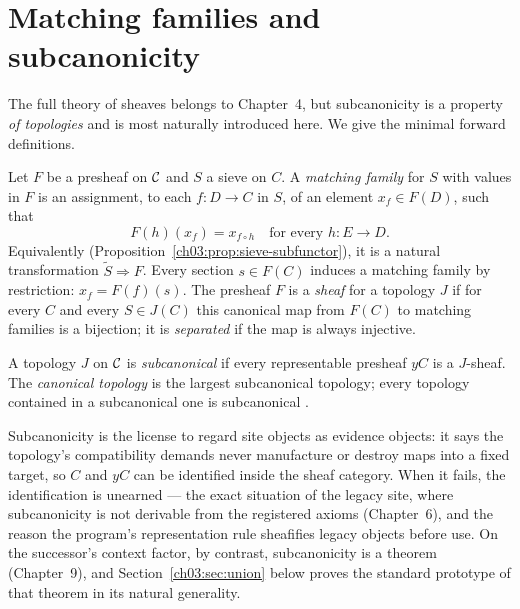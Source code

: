 \section{Matching families and subcanonicity}\label{ch03:sec:subcanonical}

The full theory of sheaves belongs to Chapter~4, but subcanonicity
is a property \emph{of topologies} and is most naturally introduced
here. We give the minimal forward definitions.

\begin{definition}\label{ch03:def:matching}
Let $F$ be a presheaf on $\mathcal{C}$ and $S$ a sieve on $C$. A
\emph{matching family} for $S$ with values in $F$ is an assignment,
to each $f : D \to C$ in $S$, of an element $x_f \in F(D)$, such
that
\[
F(h)(x_f) = x_{f \circ h}
\quad \text{for every } h : E \to D .
\]
Equivalently (Proposition~\ref{ch03:prop:sieve-subfunctor}), it is
a natural transformation $\widetilde{S} \Rightarrow F$. Every
section $s \in F(C)$ induces a matching family by restriction:
$x_f = F(f)(s)$. The presheaf $F$ is a \emph{sheaf} for a topology
$J$ if for every $C$ and every $S \in J(C)$ this canonical map
from $F(C)$ to matching families is a bijection; it is
\emph{separated} if the map is always injective.
\end{definition}

\begin{definition}\label{ch03:def:subcanonical}
A topology $J$ on $\mathcal{C}$ is \emph{subcanonical} if every
representable presheaf $yC$ is a $J$-sheaf. The \emph{canonical
topology} is the largest subcanonical topology; every topology
contained in a subcanonical one is subcanonical
\cite{stacks00WO,johnstone}.
\end{definition}

Subcanonicity is the license to regard site objects as evidence
objects: it says the topology's compatibility demands never
manufacture or destroy maps into a fixed target, so $C$ and $yC$
can be identified inside the sheaf category. When it fails, the
identification is unearned --- the exact situation of the legacy
site, where subcanonicity is not derivable from the registered
axioms (Chapter~6), and the reason the program's representation
rule sheafifies legacy objects before use. On the successor's
context factor, by contrast, subcanonicity is a theorem
(Chapter~9), and Section~\ref{ch03:sec:union} below proves the
standard prototype of that theorem in its natural generality.

